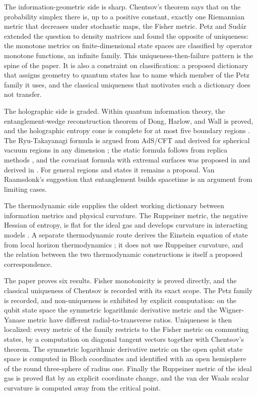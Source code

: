 \documentclass[11pt,letterpaper]{article}
\theoremstyle{definition}
\theoremstyle{remark}
\begin{document}
The information-geometric side is sharp. Chentsov's theorem \cite{chentsov, petz-sudar} says that on the probability simplex there is, up to a positive constant, exactly one Riemannian metric that decreases under stochastic maps, the Fisher metric. Petz and Sud\'ar \cite{petz-sudar} extended the question to density matrices and found the opposite of uniqueness: the monotone metrics on finite-dimensional state spaces are classified by operator monotone functions, an infinite family. This uniqueness-then-failure pattern is the spine of the paper. It is also a constraint on classification: a proposed dictionary that assigns geometry to quantum states has to name which member of the Petz family it uses, and the classical uniqueness that motivates such a dictionary does not transfer.

The holographic side is graded. Within quantum information theory, the entanglement-wedge reconstruction theorem of Dong, Harlow, and Wall \cite{dhw} is proved, and the holographic entropy cone is complete for at most five boundary regions \cite{bao, hc5}. The Ryu-Takayanagi formula \cite{rt} is argued from AdS/CFT and derived for spherical vacuum regions in any dimension \cite{chc}; the static formula follows from replica methods \cite{lm}, and the covariant formula with extremal surfaces was proposed in \cite{hrt} and derived in \cite{dlr}. For general regions and states it remains a proposal. Van Raamsdonk's suggestion that entanglement builds spacetime \cite{vr} is an argument from limiting cases.

The thermodynamic side supplies the oldest working dictionary between information metrics and physical curvature. The Ruppeiner metric, the negative Hessian of entropy, is flat for the ideal gas and develops curvature in interacting models \cite{ruppeiner}. A separate thermodynamic route derives the Einstein equation of state from local horizon thermodynamics \cite{jacobson}; it does not use Ruppeiner curvature, and the relation between the two thermodynamic constructions is itself a proposed correspondence.

The paper proves six results. Fisher monotonicity is proved directly, and the classical uniqueness of Chentsov is recorded with its exact scope. The Petz family is recorded, and non-uniqueness is exhibited by explicit computation: on the qubit state space the symmetric logarithmic derivative metric and the Wigner-Yanase metric have different radial-to-transverse ratios. Uniqueness is then localized: every metric of the family restricts to the Fisher metric on commuting states, by a computation on diagonal tangent vectors together with Chentsov's theorem. The symmetric logarithmic derivative metric on the open qubit state space is computed in Bloch coordinates and identified with an open hemisphere of the round three-sphere of radius one. Finally the Ruppeiner metric of the ideal gas is proved flat by an explicit coordinate change, and the van der Waals scalar curvature is computed away from the critical point.
\end{document}
